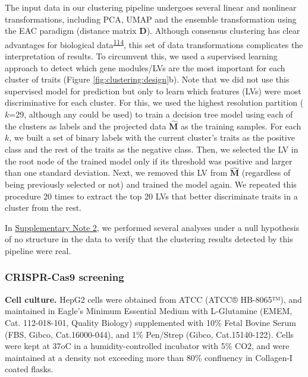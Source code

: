 \documentclass[
  a4paper,
]{article}
\begin{document}
The input data in our clustering pipeline undergoes several linear and nonlinear transformations, including PCA, UMAP and the ensemble transformation using the EAC paradigm (distance matrix \(\mathbf{D}\)).
Although consensus clustering has clear advantages for biological data\textsuperscript{\protect\hyperlink{ref-S7LBsfcF}{114}}, this set of data transformations complicates the interpretation of results.
To circumvent this, we used a supervised learning approach to detect which gene modules/LVs are the most important for each cluster of traits (Figure \ref{fig:clustering:design}b).
Note that we did not use this supervised model for prediction but only to learn which features (LVs) were most discriminative for each cluster.
For this, we used the highest resolution partition (\(k\)=29, although any could be used) to train a decision tree model using each of the clusters as labels and the projected data \(\hat{\mathbf{M}}\) as the training samples.
For each \(k\), we built a set of binary labels with the current cluster's traits as the positive class and the rest of the traits as the negative class.
Then, we selected the LV in the root node of the trained model only if its threshold was positive and larger than one standard deviation.
Next, we removed this LV from \(\hat{\mathbf{M}}\) (regardless of being previously selected or not) and trained the model again.
We repeated this procedure 20 times to extract the top 20 LVs that better discriminate traits in a cluster from the rest.

In \protect\hyperlink{sm:clustering:null_sim}{Supplementary Note 2}, we performed several analyses under a null hypothesis of no structure in the data to verify that the clustering results detected by this pipeline were real.

\hypertarget{sec:methods:crispr}{%
\subsubsection{CRISPR-Cas9 screening}\label{sec:methods:crispr}}

\textbf{Cell culture.}
HepG2 cells were obtained from ATCC (ATCC® HB-8065™), and maintained in Eagle's Minimum Essential Medium with L-Glutamine (EMEM, Cat. 112-018-101, Quality Biology) supplemented with 10\% Fetal Bovine Serum (FBS, Gibco, Cat.16000-044), and 1\% Pen/Strep (Gibco, Cat.15140-122).
Cells were kept at 37oC in a humidity-controlled incubator with 5\% CO2, and were maintained at a density not exceeding more than 80\% confluency in Collagen-I coated flasks.
\end{document}
